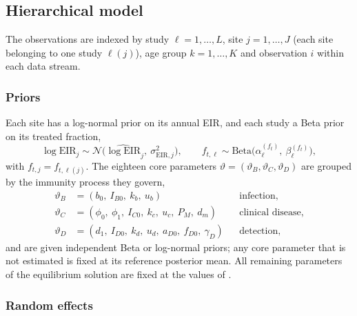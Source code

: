 \subsection{Hierarchical model}

The observations are indexed by study $\ell = 1, \dots, L$, site $j = 1, \dots, J$ (each site belonging to one study $\ell(j)$), age group $k = 1, \dots, K$ and observation $i$ within each data stream.

\subsubsection{Priors}

Each site has a log-normal prior on its annual EIR, and each study a Beta prior on its treated fraction,
\begin{equation*}
\log \mathrm{EIR}_j \sim \mathcal{N}\big(\widehat{\log \mathrm{EIR}}_j,\ \sigma_{\mathrm{EIR},j}^2\big),
\qquad
f_{t,\ell} \sim \mathrm{Beta}\big(\alpha^{(f_t)}_\ell,\ \beta^{(f_t)}_\ell\big),
\end{equation*}
with $f_{t,j} = f_{t,\ell(j)}$. The eighteen core parameters $\vartheta = (\vartheta_B, \vartheta_C, \vartheta_D)$ are grouped by the immunity process they govern,
\begin{align*}
\vartheta_B &= (b_0,\ I_{B0},\ k_b,\ u_b) && \text{infection}, \\
\vartheta_C &= (\phi_0,\ \phi_1,\ I_{C0},\ k_c,\ u_c,\ P_M,\ d_m) && \text{clinical disease}, \\
\vartheta_D &= (d_1,\ I_{D0},\ k_d,\ u_d,\ a_{D0},\ f_{D0},\ \gamma_D) && \text{detection},
\end{align*}
and are given independent Beta or log-normal priors; any core parameter that is not estimated is fixed at its reference posterior mean. All remaining parameters of the equilibrium solution are fixed at the values of \citet{griffin_estimates_2014}.

\subsubsection{Random effects}

